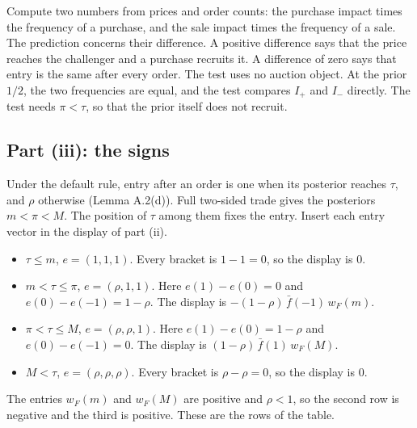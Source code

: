 \begin{intuition}
Compute two numbers from prices and order counts: the purchase impact times the frequency of a purchase, and the sale impact times the frequency of a sale. The prediction concerns their difference. A positive difference says that the price reaches the challenger and a purchase recruits it. A difference of zero says that entry is the same after every order. The test uses no auction object. At the prior \(1/2\), the two frequencies are equal, and the test compares \(I_+\) and \(I_-\) directly. The test needs \(\pi<\tau\), so that the prior itself does not recruit.
\end{intuition}

\subsection{Part (iii): the signs}\label{sec:empirical-signs}

Under the default rule, entry after an order is one when its posterior reaches \(\tau\), and \(\rho\) otherwise (Lemma A.2(d)). Full two-sided trade gives the posteriors \(m<\pi<M\). The position of \(\tau\) among them fixes the entry. Insert each entry vector in the display of part (ii).
\begin{itemize}
\item \(\tau\le m\), \(e=(1,1,1)\). Every bracket is \(1-1=0\), so the display is \(0\).
\item \(m<\tau\le\pi\), \(e=(\rho,1,1)\). Here \(e(1)-e(0)=0\) and \(e(0)-e(-1)=1-\rho\). The display is \(-(1-\rho)\,\bar f(-1)\,w_F(m)\).
\item \(\pi<\tau\le M\), \(e=(\rho,\rho,1)\). Here \(e(1)-e(0)=1-\rho\) and \(e(0)-e(-1)=0\). The display is \((1-\rho)\,\bar f(1)\,w_F(M)\).
\item \(M<\tau\), \(e=(\rho,\rho,\rho)\). Every bracket is \(\rho-\rho=0\), so the display is \(0\).
\end{itemize}
The entries \(w_F(m)\) and \(w_F(M)\) are positive and \(\rho<1\), so the second row is negative and the third is positive. These are the rows of the table.

